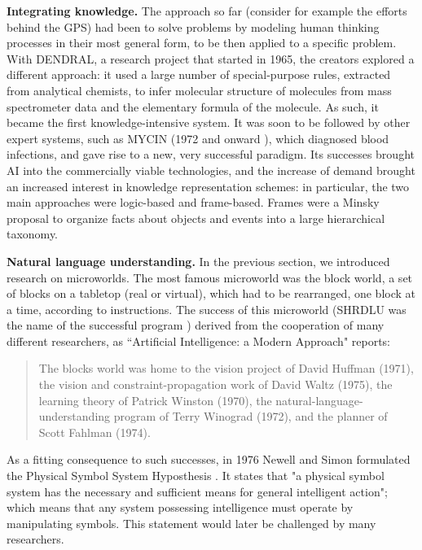 \documentclass[../main.tex]{subfiles}
\begin{document}
\vspace{4pt}
\textbf{Integrating knowledge.}
The approach so far (consider for example the efforts behind the GPS) had been to solve problems by modeling human thinking processes in their most general form, to be then applied to a specific problem. With DENDRAL, a research project that started in 1965, the creators explored a different approach: it used a large number of special-purpose rules, extracted from analytical chemists, to infer molecular structure of molecules from mass spectrometer data and the elementary formula of the molecule. As such, it became the first knowledge-intensive system.
It was soon to be followed by other expert systems, such as MYCIN (1972 and onward \parencite{MYCINArtificialIntelligence}), which diagnosed blood infections, and gave rise to a new, very successful paradigm. Its successes brought AI into the commercially viable technologies, and the increase of demand brought an increased interest in knowledge representation schemes: in particular, the two main approaches were logic-based and frame-based. Frames were a Minsky proposal \parencite{minskyFrameworkRepresentingKnowledge1975} to organize facts about objects and events into a large hierarchical taxonomy.

\vspace{4pt}
\textbf{Natural language understanding.}
In the previous section, we introduced research on microworlds.
The most famous microworld was the block world, a set of blocks on a tabletop (real or virtual), which had to be rearranged, one block at a time, according to instructions. The success of this microworld (SHRDLU was the name of the successful program  \parencite{winogradProceduresRepresentationData1971}) derived from the cooperation of many different researchers, as ``Artificial Intelligence: a Modern Approach" reports:

\begin{quote}
    The blocks world was home to the vision project of David Huffman (1971), the vision and constraint-propagation work of David Waltz (1975), the learning theory of Patrick Winston (1970), the natural-language-understanding program of Terry Winograd (1972), and the planner of Scott Fahlman (1974).
\end{quote} \parencite{russellArtificialIntelligenceModern2002}
As a fitting consequence to such successes, in 1976 Newell and Simon formulated the Physical Symbol System Hyposthesis  \parencite{newellComputerScienceEmpirical1976}. It states that "a physical symbol system has the necessary and sufficient means for general intelligent action"; which means that any system possessing intelligence must operate by manipulating symbols. This statement would later be challenged by many researchers.
\end{document}
